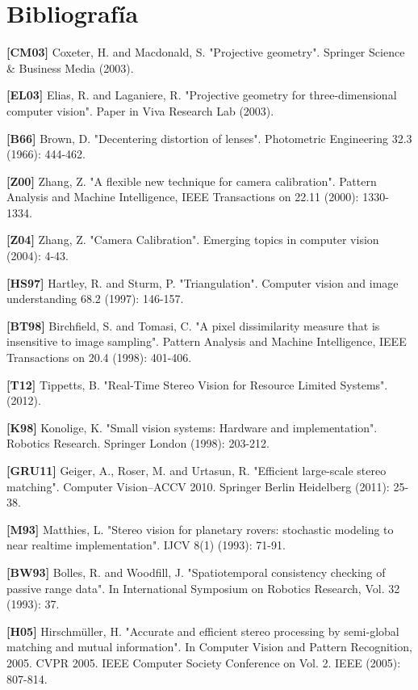 \documentclass[11pt,a4paper,titlepage]{article}
\begin{document}
\newpage

\section{Bibliografía}

\textbf{[CM03]} Coxeter, H. and Macdonald, S. "Projective geometry". Springer Science \& Business Media (2003).

\textbf{[EL03]} Elias, R. and Laganiere, R. "Projective geometry for three-dimensional computer vision". Paper in Viva Research Lab (2003).

\textbf{[B66]} Brown, D. "Decentering distortion of lenses". Photometric Engineering 32.3 (1966): 444-462.

\textbf{[Z00]} Zhang, Z. "A flexible new technique for camera calibration". Pattern Analysis and Machine Intelligence, IEEE Transactions on 22.11 (2000): 1330-1334.

\textbf{[Z04]} Zhang, Z. "Camera Calibration". Emerging topics in computer vision (2004): 4-43.

\textbf{[HS97]} Hartley, R. and Sturm, P. "Triangulation". Computer vision and image understanding 68.2 (1997): 146-157.

\textbf{[BT98]} Birchfield, S. and Tomasi, C. "A pixel dissimilarity measure that is insensitive to image sampling". Pattern Analysis and Machine Intelligence, IEEE Transactions on 20.4 (1998): 401-406.

\textbf{[T12]} Tippetts, B. "Real-Time Stereo Vision for Resource Limited Systems". (2012).

\textbf{[K98]} Konolige, K. "Small vision systems: Hardware and implementation". Robotics Research. Springer London (1998): 203-212.

\textbf{[GRU11]} Geiger, A., Roser, M. and Urtasun, R. "Efficient large-scale stereo matching". Computer Vision–ACCV 2010. Springer Berlin Heidelberg (2011): 25-38.

\textbf{[M93]} Matthies, L. "Stereo vision for planetary rovers: stochastic modeling to near realtime implementation". IJCV 8(1) (1993): 71-91.

\textbf{[BW93]} Bolles, R. and Woodfill, J. "Spatiotemporal consistency checking of passive range data". In International Symposium on Robotics Research, Vol. 32 (1993): 37.

\textbf{[H05]} Hirschmüller, H. "Accurate and efficient stereo processing by semi-global matching and mutual information". In Computer Vision and Pattern Recognition, 2005. CVPR 2005. IEEE Computer Society Conference on Vol. 2. IEEE (2005): 807-814.
\end{document}
